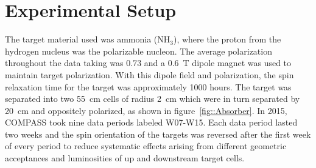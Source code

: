 \section{Experimental Setup}









The target material used was ammonia ($\mathrm{NH}_3$), where the proton from
the hydrogen nucleus was the polarizable nucleon.  The average polarization
throughout the data taking was 0.73 and a 0.6~T dipole magnet was used to
maintain target polarization.  With this dipole field and polarization, the spin
relaxation time for the target was approximately 1000 hours.  The target was
separated into two 55~cm cells of radius 2~cm which were in turn separated by
20~cm and oppositely polarized, as shown in figure~\ref{fig::Absorber}.  In 2015,
COMPASS took nine data periods labeled W07-W15.  Each data period lasted two
weeks and the spin orientation of the targets was reversed after the first week
of every period to reduce systematic effects arising from different geometric
acceptances and luminosities of up and downstream target cells.


